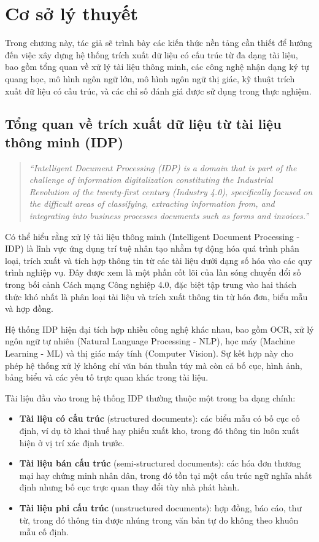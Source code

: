 ﻿\documentclass[12pt]{report}
\begin{document}
\chapter{Cơ sở lý thuyết}

Trong chương này, tác giả sẽ trình bày các kiến thức nền tảng cần thiết để hướng đến việc xây dựng hệ thống trích xuất dữ liệu có cấu trúc từ đa dạng tài liệu, bao gồm tổng quan về xử lý tài liệu thông minh, các công nghệ nhận dạng ký tự quang học, mô hình ngôn ngữ lớn, mô hình ngôn ngữ thị giác, kỹ thuật trích xuất dữ liệu có cấu trúc, và các chỉ số đánh giá được sử dụng trong thực nghiệm.

\section{Tổng quan về trích xuất dữ liệu từ tài liệu thông minh (IDP)}\label{sec:idp}

\begin{quote}
\emph{``Intelligent Document Processing (IDP) is a domain that is part of the challenge of information digitalization constituting the Industrial Revolution of the twenty-first century (Industry 4.0), specifically focused on the difficult areas of classifying, extracting information from, and integrating into business processes documents such as forms and invoices.''} \cite{zhu2021idp}
\end{quote}

Có thể hiểu rằng xử lý tài liệu thông minh (Intelligent Document Processing - IDP) là lĩnh vực ứng dụng trí tuệ nhân tạo nhằm tự động hóa quá trình phân loại, trích xuất và tích hợp thông tin từ các tài liệu dưới dạng số hóa vào các quy trình nghiệp vụ. Đây được xem là một phần cốt lõi của làn sóng chuyển đổi số trong bối cảnh Cách mạng Công nghiệp 4.0, đặc biệt tập trung vào hai thách thức khó nhất là phân loại tài liệu và trích xuất thông tin từ hóa đơn, biểu mẫu và hợp đồng.

Hệ thống IDP hiện đại tích hợp nhiều công nghệ khác nhau, bao gồm OCR, xử lý ngôn ngữ tự nhiên (Natural Language Processing - NLP), học máy (Machine Learning - ML) và thị giác máy tính (Computer Vision). Sự kết hợp này cho phép hệ thống xử lý không chỉ văn bản thuần túy mà còn cả bố cục, hình ảnh, bảng biểu và các yếu tố trực quan khác trong tài liệu.

Tài liệu đầu vào trong hệ thống IDP thường thuộc một trong ba dạng chính:

\begin{itemize}
    \item \textbf{Tài liệu có cấu trúc} (structured documents): các biểu mẫu có bố cục cố định, ví dụ tờ khai thuế hay phiếu xuất kho, trong đó thông tin luôn xuất hiện ở vị trí xác định trước.
    \item \textbf{Tài liệu bán cấu trúc} (semi-structured documents): các hóa đơn thương mại hay chứng minh nhân dân, trong đó tồn tại một cấu trúc ngữ nghĩa nhất định nhưng bố cục trực quan thay đổi tùy nhà phát hành.
    \item \textbf{Tài liệu phi cấu trúc} (unstructured documents): hợp đồng, báo cáo, thư từ, trong đó thông tin được nhúng trong văn bản tự do không theo khuôn mẫu cố định.
\end{itemize}
\end{document}
